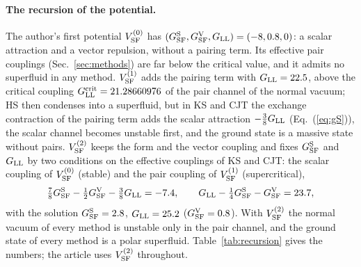 \documentclass[aps,prd,onecolumn,superscriptaddress,nofootinbib,floatfix,longbibliography]{revtex4-2}
\newcommand{\LL}{{\rm LL}}
\newcommand{\SF}{{\rm SF}}
\begin{document}
\paragraph*{The recursion of the potential.}
The author's first potential $V^{(0)}_\SF$ has $(G^{\rm S}_\SF,G^{\rm V}_\SF,G_\LL)=(-8,0.8,0)$: a scalar attraction and a vector
repulsion, without a pairing term. Its effective pair couplings (Sec.~\ref{sec:methods}) are far below the critical value, and
it admits no superfluid in any method. $V^{(1)}_\SF$ adds the pairing term with $G_\LL=22.5$, above the critical coupling
$G^{\rm crit}_\LL=21.28660976$ of the pair channel of the normal vacuum; HS then condenses into a superfluid, but in KS and CJT the
exchange contraction of the pairing term adds the scalar attraction $-\tfrac38G_\LL$ (Eq.~(\ref{eq:gS})), the scalar channel
becomes unstable first, and the ground state is a massive state without pairs. $V^{(2)}_\SF$ keeps the form and the vector
coupling and fixes $G^{\rm S}_\SF$ and $G_\LL$ by two conditions on the effective couplings of KS and CJT: the scalar coupling of
$V^{(0)}_\SF$ (stable) and the pair coupling of $V^{(1)}_\SF$ (supercritical),
\begin{equation}
\tfrac78G^{\rm S}_\SF-\tfrac12G^{\rm V}_\SF-\tfrac38G_\LL=-7.4,\qquad G_\LL-\tfrac14G^{\rm S}_\SF-G^{\rm V}_\SF=23.7,
\label{eq:recursion}
\end{equation}
with the solution $G^{\rm S}_\SF=2.8$, $G_\LL=25.2$ ($G^{\rm V}_\SF=0.8$). With $V^{(2)}_\SF$ the normal vacuum of every method is unstable
only in the pair channel, and the ground state of every method is a polar superfluid. Table~\ref{tab:recursion} gives the
numbers; the article uses $V^{(2)}_\SF$ throughout.
\end{document}
